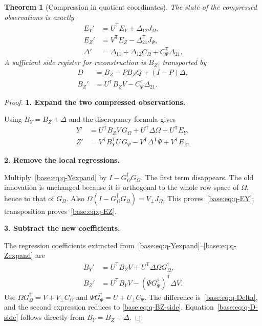 \documentclass[11pt,oneside,openany,a4paper]{book}
\numberwithin{equation}{chapter}
\newtheorem{theorem}{Theorem}[chapter]
\theoremstyle{definition}
\theoremstyle{remark}
\newcommand{\proofstep}[1]{\par\addvspace{.45\baselineskip}\Needspace{3\baselineskip}\textbf{#1}\par\nobreak}
\newcommand{\T}{\mathsf T}\newcommand{\Id}{I}
\begin{document}
\begin{theorem}[Compression in quotient coordinates]\label{base:thm:quotient-compression}
The state of the compressed observations is exactly
\begin{align}
 E_Y'&=U^{\T}E_Y+\Delta_{12}J_\Omega,\label{base:eq:q-EY}\\
 E_Z'&=V^{\T}E_Z-\Delta_{21}^{\T} J_\Psi,\label{base:eq:q-EZ}\\
 \Delta'&=\Delta_{11}+\Delta_{12}C_\Omega
                         +C_\Psi^{\T}\Delta_{21}.\label{base:eq:q-Delta}
\end{align}
A sufficient side register for reconstruction is $B_Z$, transported by
\begin{align}
 D&=B_Z-PB_ZQ+(I-P)\Delta,\label{base:eq:q-D-side}\\
 B_Z'&=U^{\T}B_ZV-C_\Psi^{\T}\Delta_{21}.\label{base:eq:q-BZ-side}
\end{align}
\end{theorem}
\begin{proof}
\proofstep{1. Expand the two compressed observations.}
Using $B_Y=B_Z+\Delta$ and the discrepancy formula gives
\begin{align}
 Y'&=U^{\T}B_ZV\,G_\Omega+U^{\T}\Delta\Omega+U^{\T}E_Y,
                                                        \label{base:eq:q-Yexpand}\\
 Z'&=V^{\T}B_Y^{\T}U\,G_\Psi-V^{\T}\Delta^{\T}\Psi+V^{\T}E_Z.
                                                        \label{base:eq:q-Zexpand}
\end{align}
\proofstep{2. Remove the local regressions.}
Multiply~\eqref{base:eq:q-Yexpand} by $I-G_\Omega^\dagger G_\Omega$.
The first term disappears. The old innovation is unchanged because it is
orthogonal to the whole row space of $\Omega$, hence to that of $G_\Omega$.
Also $\Omega(I-G_\Omega^\dagger G_\Omega)=V_\perp J_\Omega$.
This proves~\eqref{base:eq:q-EY}; transposition proves~\eqref{base:eq:q-EZ}.
\proofstep{3. Subtract the new coefficients.}
The regression coefficients extracted from~\eqref{base:eq:q-Yexpand}--\eqref{base:eq:q-Zexpand}
are
\begin{align*}
 B_Y'&=U^{\T}B_ZV+U^{\T}\Delta\Omega G_\Omega^\dagger,\\
 B_Z'&=U^{\T}B_YV-(\Psi G_\Psi^\dagger)^{\T}\Delta V.
\end{align*}
Use $\Omega G_\Omega^\dagger=V+V_\perp C_\Omega$ and
$\Psi G_\Psi^\dagger=U+U_\perp C_\Psi$.
The difference is~\eqref{base:eq:q-Delta}, and the second expression reduces to
\eqref{base:eq:q-BZ-side}. Equation~\eqref{base:eq:q-D-side} follows directly from
$B_Y=B_Z+\Delta$.\end{proof}
\end{document}
